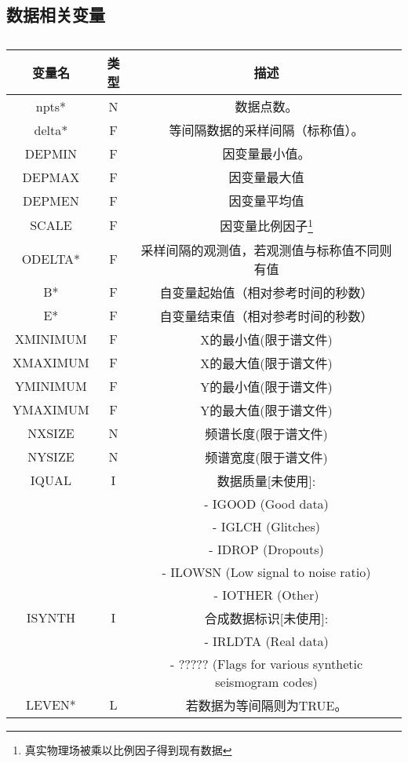 \subsection{数据相关变量}
\begin{table}[H]
\centering
\caption{}
\label{}
\begin{tabular}{ccc}
    \toprule
	变量名	&	类型	&	描述\\
	\midrule
    npts*	&   N		&	数据点数。\\
	delta*	&	F		&	等间隔数据的采样间隔（标称值）。\\
	DEPMIN	&	F 		&	因变量最小值。	\\
	DEPMAX	&	F		&	因变量最大值	\\
	DEPMEN	&	F		&	因变量平均值	\\
	SCALE	&	F		&	因变量比例因子\footnote{真实物理场被乘以比例因子得到现有数据}	\\
	ODELTA*	&	F		&	采样间隔的观测值，若观测值与标称值不同则有值\\
	B*		&	F		&	自变量起始值（相对参考时间的秒数）\\
	E*		&	F		&	自变量结束值（相对参考时间的秒数）\\
    XMINIMUM&   F       &   X的最小值(限于谱文件)   \\                                                                                                    
    XMAXIMUM&   F       &   X的最大值(限于谱文件)   \\                           
    YMINIMUM&   F       &   Y的最小值(限于谱文件)   \\                           
    YMAXIMUM&   F       &   Y的最大值(限于谱文件)   \\  
    NXSIZE  &   N       &   频谱长度(限于谱文件)    \\                           
    NYSIZE  &   N       &   频谱宽度(限于谱文件)    \\
    IQUAL   &   I       &   数据质量[未使用]:   \\                                                                                                        
                        && - IGOOD (Good data)  \\                               
                        && - IGLCH (Glitches)   \\                               
                        && - IDROP (Dropouts)   \\                               
                        && - ILOWSN (Low signal to noise ratio) \\               
                        && - IOTHER (Other)\\                                    
    ISYNTH  &   I       &   合成数据标识[未使用]:\\                              
                        && - IRLDTA (Real data) \\                               
                        && - ????? (Flags for various synthetic seismogram codes) \\
     LEVEN*  &   L       &   若数据为等间隔则为TRUE。\\
    \bottomrule
\end{tabular}
\end{table}

